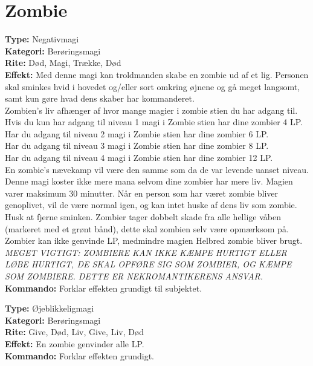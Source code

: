 \section*{Zombie}
\begin{zombie*}
\textbf{Type:} Negativmagi\\
\textbf{Kategori:} Berøringsmagi\\
\textbf{Rite:} Død, Magi, Trække, Død\\

\textbf{Effekt:} Med denne magi kan troldmanden skabe en zombie ud af et lig. Personen skal sminkes hvid i hovedet og/eller sort omkring øjnene og gå meget langsomt, samt kun gøre hvad dens skaber har kommanderet.\\
Zombien's liv afhænger af hvor mange magier i zombie stien du har adgang til.\\ Hvis du kun har adgang til niveau 1 magi i Zombie stien har dine zombier 4 LP.\\ Har du adgang til niveau 2 magi i Zombie stien har dine zombier 6 LP.\\ Har du adgang til niveau 3 magi i Zombie stien har dine zombier 8 LP.\\ Har du adgang til niveau 4 magi i Zombie stien har dine zombier 12 LP.\\
En zombie's nævekamp vil være den samme som da de var levende uanset niveau. Denne magi koster ikke mere mana selvom dine zombier har mere liv. Magien varer maksimum 30 minutter. Når en person som har været zombie bliver genoplivet, vil de være normal igen, og kan intet huske af dens liv som zombie. Husk at fjerne sminken. Zombier tager dobbelt skade fra alle hellige våben (markeret med et grønt bånd), dette skal zombien selv være opmærksom på. Zombier kan ikke genvinde LP, medmindre
magien Helbred zombie bliver brugt.\\
\textit{MEGET VIGTIGT: ZOMBIERE KAN IKKE KÆMPE HURTIGT ELLER LØBE HURTIGT, DE SKAL OPFØRE SIG SOM ZOMBIER, OG KÆMPE SOM ZOMBIERE. DETTE ER NEKROMANTIKERENS ANSVAR.}\\
\textbf{Kommando:} Forklar effekten grundigt til subjektet.\\
\end{zombie*}

\begin{zombie*}
\textbf{Type:} Øjeblikkeligmagi\\
\textbf{Kategori:} Berøringsmagi\\
\textbf{Rite:} Give, Død, Liv, Give, Liv, Død\\
\textbf{Effekt:} En zombie genvinder alle LP.\\
\textbf{Kommando:} Forklar effekten grundigt.
\end{zombie*}

